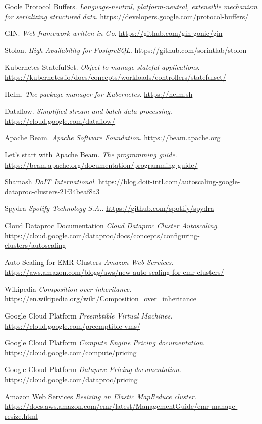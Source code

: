 \documentclass[12pt,twoside,cucitura]{toptesi}
\begin{document}
\begin{thebibliography}{9}
Goole Protocol Buffers. 
\textit{Language-neutral, platform-neutral, extensible mechanism for serializing structured data}.
\url{https://developers.google.com/protocol-buffers/}

GIN. 
\textit{Web-framework written in Go}.
\url{https://github.com/gin-gonic/gin}

Stolon. 
\textit{High-Availability for PostgreSQL}.
\url{https://github.com/sorintlab/stolon}

Kubernetes StatefulSet. 
\textit{Object to manage stateful applications}.
\url{https://kubernetes.io/docs/concepts/workloads/controllers/statefulset/}

Helm. 
\textit{The package manager for Kubernetes}.
\url{https://helm.sh}

Dataflow. 
\textit{Simplified stream and batch data processing}.
\url{https://cloud.google.com/dataflow/}

Apache Beam. 
\textit{Apache Software Foundation}.
\url{https://beam.apache.org}

Let's start with Apache Beam. 
\textit{The programming guide}.
\url{https://beam.apache.org/documentation/programming-guide/}

Shamash
\textit{DoIT International}.
\url{https://blog.doit-intl.com/autoscaling-google-dataproc-clusters-21f34beaf8a3}

Spydra
\textit{Spotify Technology S.A.}.
\url{https://github.com/spotify/spydra}

Cloud Dataproc Documentation
\textit{Cloud Dataproc Cluster Autoscaling}.
\url{https://cloud.google.com/dataproc/docs/concepts/configuring-clusters/autoscaling}

Auto Scaling for EMR Clusters
\textit{Amazon Web Services}.
\url{https://aws.amazon.com/blogs/aws/new-auto-scaling-for-emr-clusters/}

Wikipedia
\textit{Composition over inheritance}.
\url{https://en.wikipedia.org/wiki/Composition_over_inheritance}

Google Cloud Platform
\textit{Preembtible Virtual Machines}.
\url{https://cloud.google.com/preemptible-vms/}

Google Cloud Platform
\textit{Compute Engine Pricing documentation}.
\url{https://cloud.google.com/compute/pricing}

Google Cloud Platform
\textit{Dataproc Pricing documentation}.
\url{https://cloud.google.com/dataproc/pricing}

Amazon Web Services
\textit{Resizing an Elastic MapReduce cluster}.
\url{https://docs.aws.amazon.com/emr/latest/ManagementGuide/emr-manage-resize.html}

\end{thebibliography}
\end{document}
